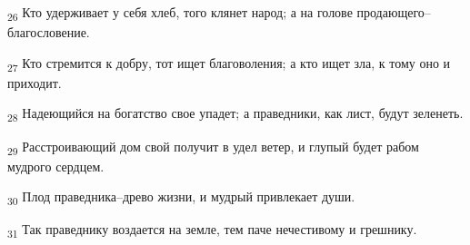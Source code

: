 \begin{tcolorbox}
\textsubscript{26} Кто удерживает у себя хлеб, того клянет народ; а на голове продающего--благословение.
\end{tcolorbox}
\begin{tcolorbox}
\textsubscript{27} Кто стремится к добру, тот ищет благоволения; а кто ищет зла, к тому оно и приходит.
\end{tcolorbox}
\begin{tcolorbox}
\textsubscript{28} Надеющийся на богатство свое упадет; а праведники, как лист, будут зеленеть.
\end{tcolorbox}
\begin{tcolorbox}
\textsubscript{29} Расстроивающий дом свой получит в удел ветер, и глупый будет рабом мудрого сердцем.
\end{tcolorbox}
\begin{tcolorbox}
\textsubscript{30} Плод праведника--древо жизни, и мудрый привлекает души.
\end{tcolorbox}
\begin{tcolorbox}
\textsubscript{31} Так праведнику воздается на земле, тем паче нечестивому и грешнику.
\end{tcolorbox}
